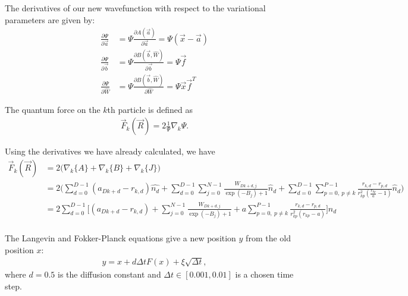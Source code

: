 \documentclass[12pt]{article}
\begin{document}
\noindent The derivatives of our new wavefunction with respect to the variational parameters are given by:
\begin{align*}
\frac{\partial \Psi}{\partial \vec{a}} &= \Psi \frac{\partial A(\vec{a})}{\partial \vec{a}} = \Psi (\vec{x}-\vec{a})\\
\frac{\partial \Psi}{\partial \vec{b}} &= \Psi \frac{\partial B(\vec{b},\hat{W})}{\partial \vec{b}} = \Psi \vec{f} \\
\frac{\partial \Psi}{\partial \hat{W}} &= \Psi \frac{\partial B(\vec{b},\hat{W})}{\partial \hat{W}}
= \Psi \vec{x} \vec{f}^T
\end{align*}


\noindent The quantum force on the $k$th particle is defined as 
\begin{align}
\vec{F}_k(\vec{R}) = 2 \frac{1}{\Psi} \nabla_k \Psi.
\end{align}

\noindent Using the derivatives we have already calculated, we have
\begin{align*}
\vec{F}_k(\vec{R}) &= 2 \Big( \nabla_k \{ A \} + \nabla_k \{ B \} +\nabla_k \{ J \} \Big)\\
&= 2 \bigg( \sum_{d=0}^{D-1} (a_{Dk+d} -r_{k,d} ) \hat{n_{d}}  
 + \sum_{d=0}^{D-1} \sum_{j=0}^{N-1}  \frac{W_{Dk+d,j}}{\exp(-B_j)+1}   \hat{n}_d  
 + \sum_{d=0}^{D-1} \sum_{p=0, \ p\neq k}^{P-1} \frac{r_{k,d}-r_{p,d}}{r_{kp}^2 \left( \frac{r_{kp}}{a} -1 \right)} \hat{n}_d
 \bigg)\\
 &= 2 \sum_{d=0}^{D-1} \bigg[  (a_{Dk+d} -r_{k,d} ) 
 + \sum_{j=0}^{N-1}  \frac{W_{Dk+d,j}}{\exp(-B_j)+1}    
 +  a \sum_{p=0, \ p\neq k}^{P-1} \frac{r_{k,d}-r_{p,d}}{r_{kp}^2 \left( r_{kp}-a \right)} 
 \bigg]\hat{n}_d\\
\end{align*}

\noindent The Langevin and Fokker-Planck equations give a new position $y$ from the old position $x$:
\begin{align}
y = x + d\Delta tF(x) + \xi \sqrt{\Delta t},
\end{align}
where $d=0.5$ is the diffusion constant and $\Delta t \in [0.001,0.01]$ is a chosen time step. \\
\end{document}
